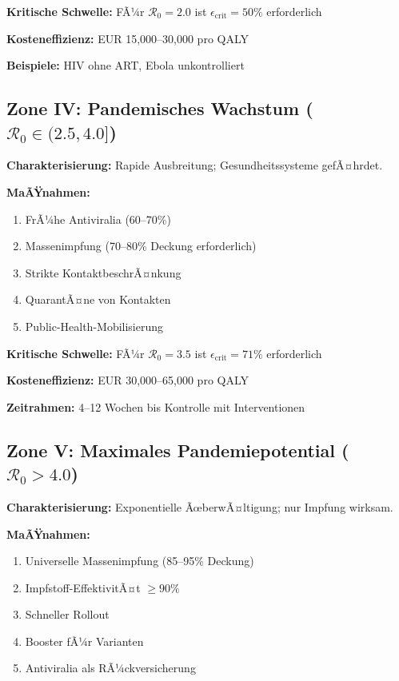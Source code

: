 ﻿\documentclass[a4paper,12pt,twoside]{article}
\theoremstyle{definition}
\begin{document}
\textbf{Kritische Schwelle:} FÃ¼r $\mathcal{R}_0 = 2.0$ ist $\epsilon_{\text{crit}} = 50\%$ erforderlich

\textbf{Kosteneffizienz:} EUR 15,000--30,000 pro QALY

\textbf{Beispiele:} HIV ohne ART, Ebola unkontrolliert

\subsection{Zone IV: Pandemisches Wachstum ($\mathcal{R}_0 \in (2.5, 4.0]$)}

\textbf{Charakterisierung:} Rapide Ausbreitung; Gesundheitssysteme gefÃ¤hrdet.

\textbf{MaÃŸnahmen:}
\begin{enumerate}
\item FrÃ¼he Antiviralia (60--70\%)
\item Massenimpfung (70--80\% Deckung erforderlich)
\item Strikte KontaktbeschrÃ¤nkung
\item QuarantÃ¤ne von Kontakten
\item Public-Health-Mobilisierung
\end{enumerate}

\textbf{Kritische Schwelle:} FÃ¼r $\mathcal{R}_0 = 3.5$ ist $\epsilon_{\text{crit}} = 71\%$ erforderlich

\textbf{Kosteneffizienz:} EUR 30,000--65,000 pro QALY

\textbf{Zeitrahmen:} 4--12 Wochen bis Kontrolle mit Interventionen

\subsection{Zone V: Maximales Pandemiepotential ($\mathcal{R}_0 > 4.0$)}

\textbf{Charakterisierung:} Exponentielle ÃœberwÃ¤ltigung; nur Impfung wirksam.

\textbf{MaÃŸnahmen:}
\begin{enumerate}
\item Universelle Massenimpfung (85--95\% Deckung)
\item Impfstoff-EffektivitÃ¤t $\geq 90\%$
\item Schneller Rollout
\item Booster fÃ¼r Varianten
\item Antiviralia als RÃ¼ckversicherung
\end{enumerate}
\end{document}
